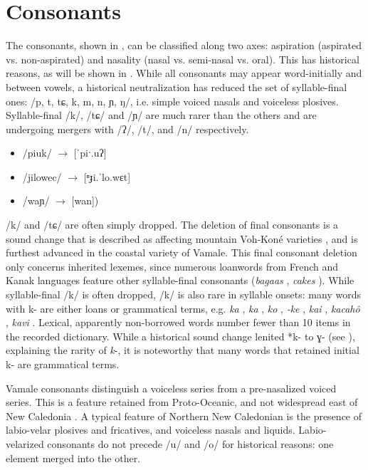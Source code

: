 	\section{Consonants}
	\label{sec:consphonemes}
	The consonants, shown in , can be classified along two axes: aspiration (aspirated vs. non-aspirated) and nasality (nasal vs. semi-nasal vs. oral). This has historical reasons, as will be shown in . 
	While all consonants may appear word-initially and between vowels, a historical neutralization has reduced the set of syllable-final ones: /p, t, tɕ, k, m, n, ɲ, ŋ/, i.e. simple voiced nasals and voiceless plosives. Syllable-final /k/, /tɕ/ and /ɲ/ are much rarer than the others and are undergoing mergers with /ʔ/, /t/, and /n/ respectively. 
	\begin{itemize}
		
	\item /piuk/  $\rightarrow$ [ˈpiˑ.uʔ] 
	\item /jilowec/  $\rightarrow$  [ⁿɟi.ˈlo.wɛt] 
	\item /waɲ/  $\rightarrow$ [wan])

\end{itemize}
	 /k/ and /tɕ/ are often simply dropped. The deletion of final consonants is a sound change that is described as affecting mountain Voh-Koné varieties \parencite[25]{campbell_phenomenon_1987}, and is furthest advanced in the coastal variety of Vamale. This final consonant deletion only concerns inherited lexemes, since numerous loanwords from French and Kanak languages feature other syllable-final consonants (\textit{bagaas} , \textit{cakes} ).
	While syllable-final /k/ is often dropped, /k/ is also rare in syllable onsets: many words with k- are either loans or grammatical terms, e.g. \textit{ka} , \textit{ka} , \textit{ko} , \textit{-ke} , \textit{kai} , \textit{kacahô} , \textit{kavi} . Lexical, apparently non-borrowed words number fewer than 10 items in the recorded dictionary. While a historical sound change lenited *k- to ɣ- (see ), explaining the rarity of \textit{k}-, it is noteworthy that many words that retained initial k- are grammatical terms.
	
	Vamale consonants distinguish a voiceless series from a pre-nasalized voiced series. This is a feature retained from Proto-Oceanic, and not widespread east of New Caledonia \parencite[196--197]{ozanne-rivierre_proto-oceanic_1992}. A typical feature of Northern New Caledonian is the presence of labio-velar plosives and fricatives, and voiceless nasals and liquids. Labio-velarized consonants do not precede /u/ and /o/ for historical reasons: one element merged into the other.

